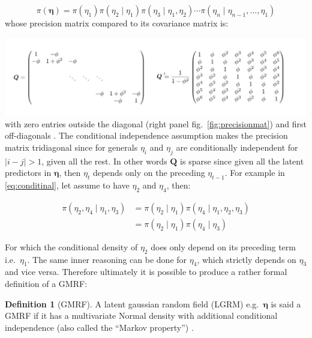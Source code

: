 \documentclass[
  12pt,
  a4paper,
  oneside]{book}
\theoremstyle{definition}
\newtheorem{definition}{Definition}[chapter]
\theoremstyle{definition}
\theoremstyle{definition}
\theoremstyle{remark}
\begin{document}
\[
\pi(\boldsymbol{\eta})=\pi\left(\eta_{1}\right) \pi\left(\eta_{2} \mid \eta_{1}\right) \pi\left(\eta_{3} \mid \eta_{1}, \eta_{2}\right) \cdots \pi\left(\eta_{n} \mid \eta_{n-1}, \ldots, \eta_{1}\right)
\]
whose precision matrix compared to its covariance matrix is:

\includegraphics{images/precvscov.jpg}
with zero entries outside the diagonal (right panel fig.~\ref{fig:precisionmat}) and first off-diagonals \citeyearpar{GRMFRue}.
The conditional independence assumption makes the precision matrix tridiagonal since for generals \(\eta_i\) and \(\eta_j\) are conditionally independent for \(|i − j| > 1\), given all the rest. In other words \(\boldsymbol{Q}\) is sparse since given all the latent predictors in \(\boldsymbol\eta\), then \(\eta_t\) depends only on the preceding \(\eta_{t-1}\). For example in \eqref{eq:conditinal}, let assume to have \(\eta_2\) and \(\eta_4\), then:

\begin{equation} 
\begin{split}
  \pi\left(\eta_{2}, \eta_{4} \mid \eta_{1}, \eta_{3}\right) &=\pi\left(\eta_{2} \mid \eta_{1}\right) \pi\left(\eta_{4} \mid \eta_{1}, \eta_{2}, \eta_{3}\right) \\
  & =\pi\left(\eta_{2} \mid \eta_{1}\right) \pi\left(\eta_{4} \mid \eta_{3}\right)
\end{split}
\label{eq:conditinal}
\end{equation}

For which the conditional density of \(\eta_2\) does only depend on its preceding term i.e.~\(\eta_1\). The same inner reasoning can be done for \(\eta_4\), which strictly depends on \(\eta_3\) and vice versa.
Therefore ultimately it is possible to produce a rather formal definition of a GMRF:

\begin{definition}[GMRF]
\protect\hypertarget{def:gmrf}{}{\label{def:gmrf} {} }A latent gaussian random field (LGRM) e.g.~\(\boldsymbol\eta\) is said a GMRF if it has a multivariate Normal density with additional conditional independence (also called the ``Markov property'') \citep{wang2018bayesian}.
\end{definition}
\end{document}
